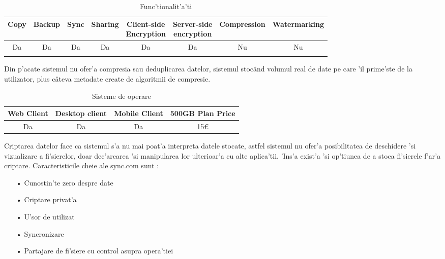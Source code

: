\documentclass[12pt,a4paper,twoside]{report}
\newcommand{\greencheck}{\color{green}  \ding{51}}
\newcommand{\redxmark}{\color{red} \ding{55}}
\begin{document}
\begin{table}[H]
\small
\centering
\caption{Func'tionalit'a'ti}
\begin{tabular}{|c|c|c|c|c|c|c|c|}          
\hline               
Copy & Backup & Sync & Sharing & \makecell{Client-side\\ Encryption} & \makecell{Server-side \\ encryption} & Compression & Watermarking \\ [0.5ex]   
\hline 
Da & Da & Da & Da & Da & Da & Nu & Nu    \\                      
\greencheck & \greencheck\greencheck & \greencheck & \greencheck & \greencheck\greencheck & \greencheck\greencheck &  \redxmark\redxmark &  \redxmark\redxmark  \\               
\hline                              
\end{tabular}
\label{table:syncfeaturetable}             
\end{table}
Din p'acate sistemul nu ofer'a compresia sau deduplicarea datelor, sistemul stocând volumul real de date pe care 'il prime'ste de la utilizator, plus câteva metadate create de algoritmii de compresie.
\begin{table}[H]
\centering
\caption{Sisteme de operare}
\begin{tabular}{|c|c|c|c|}          
\hline                      
 Web Client & Desktop client & Mobile Client & 500GB Plan Price\\ [0.5ex]   
\hline                            
Da & Da & Da & 15\euro \\               
\hline                              
\end{tabular}
\label{table:syncsystemtable}             
\end{table}
Criptarea datelor face ca sistemul s'a nu mai poat'a interpreta datele stocate, astfel sistemul nu ofer'a posibilitatea de deschidere 'si vizualizare a fi'sierelor, doar dec'arcarea 'si manipularea lor ulterioar'a cu alte aplica'tii. 'Ins'a exist'a 'si op'tiunea de a stoca fi'sierele f'ar'a criptare. Caracteristicile cheie ale sync.com sunt :
\begin{itemize}
\item[•] {Cunostin'te zero despre date}
\item[•] {Criptare privat'a}
\item[•] {U'sor de utilizat}
\item[•] {Syncronizare}
\item[•] {Partajare de fi'siere cu control asupra opera'tiei}
\end{itemize}
\end{document}
